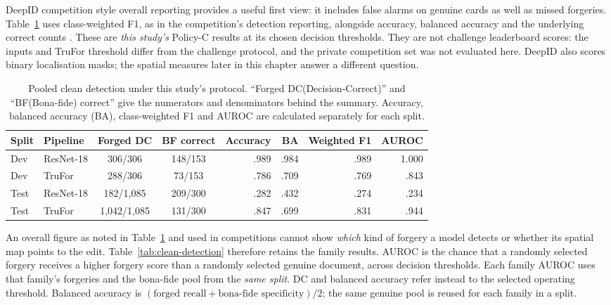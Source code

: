 DeepID competition style overall reporting provides a useful first view: it includes false alarms on genuine cards as well as missed forgeries. Table~\ref{tab:clean-pooled} uses class-weighted F1, as in the competition's detection reporting, alongside accuracy, balanced accuracy and the underlying correct counts \citep{korshunov2025deepid}. These are \emph{this study's} Policy-C results at its chosen decision thresholds. They are not challenge leaderboard scores: the inputs and TruFor threshold differ from the challenge protocol, and the private competition set was not evaluated here. DeepID also scores binary localisation masks; the spatial measures later in this chapter answer a different question.

\begin{table}[htbp]
\centering
\small
\setlength{\tabcolsep}{4.5pt}
\caption{Pooled clean detection under this study's protocol. ``Forged DC(Decision-Correct)'' and ``BF(Bona-fide) correct'' give the numerators and denominators behind the summary. Accuracy, balanced accuracy (BA), class-weighted F1 and AUROC are calculated separately for each split.}
\label{tab:clean-pooled}

\begin{tabular}{@{}ll|cc|rrrr@{}}
\toprule
Split & Pipeline & Forged DC & BF correct & Accuracy & BA & Weighted F1 & AUROC \\
\midrule

Dev & ResNet-18 & 306/306 & 148/153 & .989 & .984 & .989 & 1.000 \\
Dev & TruFor & 288/306 & 73/153 & .786 & .709 & .769 & .843 \\
\midrule

Test & ResNet-18 & 182/1,085 & 209/300 & .282 & .432 & .274 & .234 \\
Test & TruFor & 1,042/1,085 & 131/300 & .847 & .699 & .831 & .944 \\

\bottomrule
\end{tabular}
\end{table}

An overall figure as noted in Table~\ref{tab:clean-pooled} and used in competitions cannot show \emph{which} kind of forgery a model detects or whether its spatial map points to the edit. Table~\ref{tab:clean-detection} therefore retains the family results. AUROC is the chance that a randomly selected forgery receives a higher forgery score than a randomly selected genuine document, across decision thresholds. Each family AUROC uses that family's forgeries and the bona-fide pool from the \emph{same split}. DC and balanced accuracy refer instead to the selected operating threshold. Balanced accuracy is $(\text{forged recall}+\text{bona-fide specificity})/2$; the same genuine pool is reused for each family in a split. 

